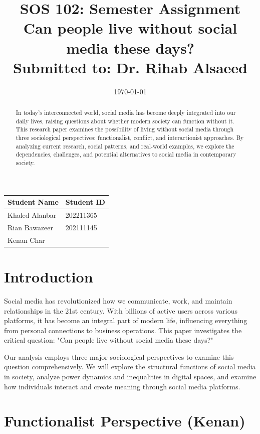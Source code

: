 \documentclass{article}
\title{SOS 102: Semester Assignment\\
\large Can people live without social media these days?\\
\vspace{0.5cm}
\normalsize Submitted to: Dr. Rihab Alsaeed}
\date{\today}
\begin{document}
\maketitle

\vspace{1cm}
\begin{center}
\begin{tabular}{|p{5cm}|p{5cm}|}
\hline
\textbf{Student Name} & \textbf{Student ID} \\
\hline
Khaled Alanbar & 202211365 \\
\hline
Rian Bawazeer & 202111145 \\
\hline
Kenan Char  &  \\
\hline
\end{tabular}
\end{center}
\newpage

\begin{abstract}
\noindent
In today's interconnected world, social media has become deeply integrated into our daily lives, raising questions about whether modern society can function without it. This research paper examines the possibility of living without social media through three sociological perspectives: functionalist, conflict, and interactionist approaches. By analyzing current research, social patterns, and real-world examples, we explore the dependencies, challenges, and potential alternatives to social media in contemporary society.
\end{abstract}
\newpage

\section{Introduction}
\indent Social media has revolutionized how we communicate, work, and maintain relationships in the 21st century. With billions of active users across various platforms, it has become an integral part of modern life, influencing everything from personal connections to business operations. This paper investigates the critical question: "Can people live without social media these days?"

Our analysis employs three major sociological perspectives to examine this question comprehensively. We will explore the structural functions of social media in society, analyze power dynamics and inequalities in digital spaces, and examine how individuals interact and create meaning through social media platforms.

\section{Functionalist Perspective (Kenan)}
\end{document}
